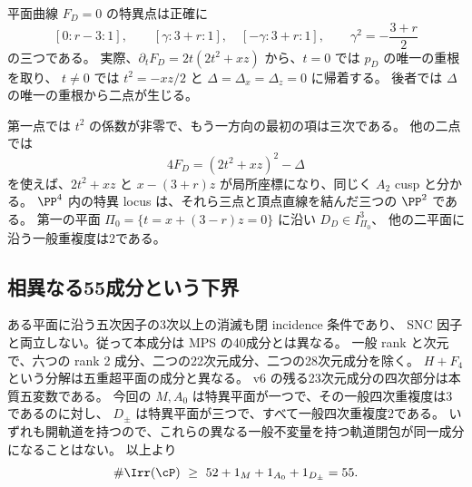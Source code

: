 平面曲線 $F_D=0$ の特異点は正確に
\[
 [0:r-3:1],\qquad [\gamma:3+r:1],\quad[-\gamma:3+r:1],
 \qquad \gamma^2=-\frac{3+r}{2}
\]
の三つである。
実際、$\partial_tF_D=2t(2t^2+xz)$ から、$t=0$ では $p_D$ の唯一の重根を取り、
$t\ne0$ では $t^2=-xz/2$ と $\Delta=\Delta_x=\Delta_z=0$ に帰着する。
後者では $\Delta$ の唯一の重根から二点が生じる。

第一点では $t^2$ の係数が非零で、もう一方向の最初の項は三次である。
他の二点では
\[
 4F_D=(2t^2+xz)^2-\Delta
\]
を使えば、$2t^2+xz$ と $x-(3+r)z$ が局所座標になり、同じく $A_2$ cusp と分かる。
$\PP^4$ 内の特異 locus は、それら三点と頂点直線を結んだ三つの $\PP^2$ である。
第一の平面 $\Pi_0=\{t=x+(3-r)z=0\}$ に沿い $D_D\in I_{\Pi_0}^3$、
他の二平面に沿う一般重複度は2である。

\subsection{相異なる55成分という下界}
ある平面に沿う五次因子の3次以上の消滅も閉 incidence 条件であり、
SNC 因子と両立しない。従って本成分は MPS の40成分とは異なる。
一般 rank と次元で、六つの rank 2 成分、二つの22次元成分、二つの28次元成分を除く。
$H+F_4$ という分解は五重超平面の成分と異なる。
v6 の残る23次元成分の四次部分は本質五変数である。
今回の $M,A_0$ は特異平面が一つで、その一般四次重複度は3であるのに対し、
$D_\pm$ は特異平面が三つで、すべて一般四次重複度2である。
いずれも開軌道を持つので、これらの異なる一般不変量を持つ軌道閉包が同一成分になることはない。
以上より
\[
 \#\Irr(\cP)\ \ge\ 52+1_M+1_{A_0}+1_{D_\pm}=55.
\]
